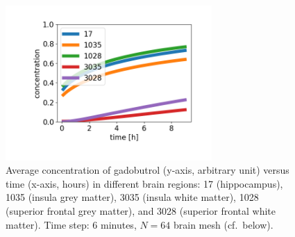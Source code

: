 \begin{figure}%
  \centering
  \includegraphics[width=0.7\textwidth]{./graphics/chp6/tracer_uniform_notlump_regions_64.png}
  \caption{Average concentration of gadobutrol (y-axis, arbitrary
    unit) versus time (x-axis, hours) in different brain regions: 17
    (hippocampus), 1035 (insula grey matter), 3035 (insula white
    matter), 1028 (superior frontal grey matter), and 3028
    (superior frontal white matter). Time step: 6 minutes, $N=64$ brain
    mesh (cf.~below).}
  \label{chp6:regions}
\end{figure}

